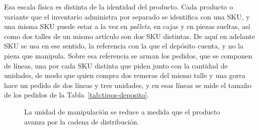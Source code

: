 Esa escala física es distinta de la identidad del producto.
Cada producto o variante que el inventario administra por separado se identifica con una \gls{SKU}, y una misma SKU puede estar a la vez en \emph{pallets}, en cajas y en piezas sueltas, así como dos talles de un mismo artículo son dos SKU distintas.
De aquí en adelante SKU se usa en ese sentido, la referencia con la que el depósito cuenta, y no la pieza que manipula.
Sobre esa referencia se arman los pedidos, que se componen de líneas, una por cada SKU distinta que piden junto con la cantidad de unidades, de modo que quien compra dos remeras del mismo talle y una gorra hace un pedido de dos líneas y tres unidades, y en esas líneas se mide el tamaño de los pedidos de la Tabla~\ref{tab:tipos-deposito}.

\begin{figure}[ht]
    \centering
    \caption{La unidad de manipulación se reduce a medida que el producto avanza por la cadena de distribución.}
    \label{fig:unidades-manipulacion}
\end{figure}


